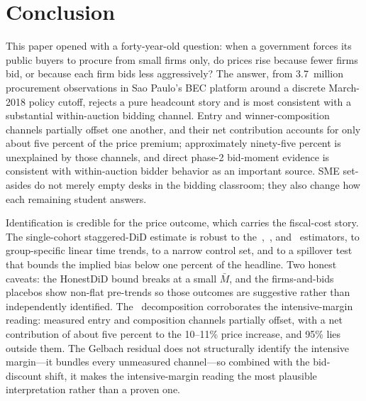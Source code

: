 \section{Conclusion}

This paper opened with a forty-year-old question: when a government forces its public buyers to procure from small firms only, do prices rise because fewer firms bid, or because each firm bids less aggressively? The answer, from 3.7~million procurement observations in Sao Paulo's BEC platform around a discrete March-2018 policy cutoff, rejects a pure headcount story and is most consistent with a substantial within-auction bidding channel. Entry and winner-composition channels partially offset one another, and their net contribution accounts for only about five percent of the price premium; approximately ninety-five percent is unexplained by those channels, and direct phase-2 bid-moment evidence is consistent with within-auction bidder behavior as an important source. SME set-asides do not merely empty desks in the bidding classroom; they also change how each remaining student answers.

Identification is credible for the price outcome, which carries the fiscal-cost story. The single-cohort staggered-DiD estimate is robust to the~\citet{callaway2021},~\citet{sun2021}, and~\citet{goodmanbacon2021} estimators, to group-specific linear time trends, to a narrow control set, and to a spillover test that bounds the implied bias below one percent of the headline. Two honest caveats: the HonestDiD bound breaks at a small $\bar M$, and the firms-and-bids placebos show non-flat pre-trends so those outcomes are suggestive rather than independently identified. The~\citet{gelbach2016} decomposition corroborates the intensive-margin reading: measured entry and composition channels partially offset, with a net contribution of about five percent to the 10--11\% price increase, and 95\% lies outside them. The Gelbach residual does not structurally identify the intensive margin---it bundles every unmeasured channel---so combined with the bid-discount shift, it makes the intensive-margin reading the most plausible interpretation rather than a proven one.

